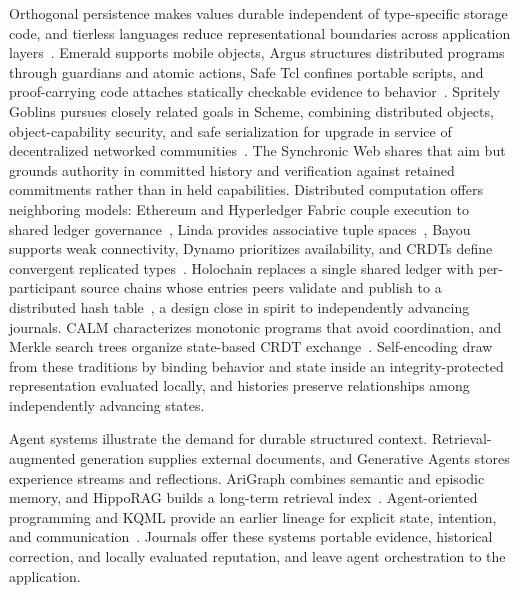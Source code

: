 Orthogonal persistence makes values durable independent of type-specific storage code, and tierless languages reduce representational boundaries across application layers~\cite{Atkinson1983approach,Cooper2007links}. Emerald supports mobile objects, Argus structures distributed programs through guardians and atomic actions, Safe Tcl confines portable scripts, and proof-carrying code attaches statically checkable evidence to behavior~\cite{Raj1991emerald,Liskov1988distributed,Levy1995safe,Necula1997proof}. Spritely Goblins pursues closely related goals in Scheme, combining distributed objects, object-capability security, and safe serialization for upgrade in service of decentralized networked communities~\cite{LemmerWebber2025spritely}. The Synchronic Web shares that aim but grounds authority in committed history and verification against retained commitments rather than in held capabilities. Distributed computation offers neighboring models: Ethereum and Hyperledger Fabric couple execution to shared ledger governance~\cite{Wood2014ethereum,Androulaki2018hyperledger}, Linda provides associative tuple spaces~\cite{Gelernter1985generative}, Bayou supports weak connectivity, Dynamo prioritizes availability, and CRDTs define convergent replicated types~\cite{Terry1995managing,DeCandia2007dynamo,Shapiro2011conflict}. Holochain replaces a single shared ledger with per-participant source chains whose entries peers validate and publish to a distributed hash table~\cite{HarrisBraun2018holochain}, a design close in spirit to independently advancing journals. CALM characterizes monotonic programs that avoid coordination, and Merkle search trees organize state-based CRDT exchange~\cite{Hellerstein2020keeping,Auvolat2019merkle}. Self-encoding  draw from these traditions by binding behavior and state inside an integrity-protected representation evaluated locally, and histories preserve relationships among independently advancing states.

Agent systems illustrate the demand for durable structured context. Retrieval-augmented generation supplies external documents, and Generative Agents stores experience streams and reflections. AriGraph combines semantic and episodic memory, and HippoRAG builds a long-term retrieval index~\cite{Lewis2020retrieval,Park2023generative,Anokhin2025arigraph,Gu2024hipporag}. Agent-oriented programming and KQML provide an earlier lineage for explicit state, intention, and communication~\cite{Shoham1993agent,Finin1994kqml}. Journals offer these systems portable evidence, historical correction, and locally evaluated reputation, and leave agent orchestration to the application.
